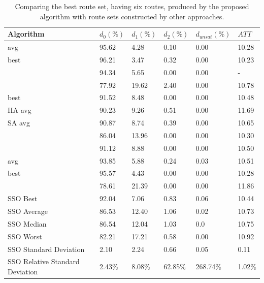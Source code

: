     \begin{table}[H]
    \centering
    \hspace*{-1.0cm}
    \begin{tabular}{|l||l|l|l|l|l|}
    \hline
    Algorithm & $d_0(\%)$ & $d_1(\%)$ & $d_2(\%)$ & $d_{unsat}(\%)$ & $ATT$ \\
    \hline
    \citet{kechagiopoulos14} avg & 95.62 & 4.28 & 0.10 & 0.00 & 10.28 \\
    \citet{kechagiopoulos14} best & 96.21 & 3.47 & 0.32 & 0.00 & 10.23 \\
    \citet{nikolic14} & 94.34 & 5.65 & 0.00 & 0.00 & - \\
    \citet{kidwai98} & 77.92 & 19.62 & 2.40 & 0.00 & 10.78 \\
    \citet{fan10} best & 91.52 & 8.48 & 0.00 & 0.00 & 10.48  \\
    \citet{fan10} HA avg & 90.23 & 9.26 & 0.51 & 0.00 & 11.69 \\
    \citet{fan10} SA avg & 90.87 & 8.74 & 0.39 & 0.00 & 10.65 \\
    \citet{chakroborty02} & 86.04 & 13.96 & 0.00 & 0.00 & 10.30 \\
    \citet{zhang10} & 91.12 & 8.88 & 0.00 & 0.00 & 10.50 \\
    \citet{chew12} avg & 93.85 & 5.88 & 0.24 & 0.03 & 10.51 \\
    \citet{chew12} best & 95.57 & 4.43 & 0.00 & 0.00 & 10.28 \\
    \citet{baaj91} & 78.61 & 21.39 & 0.00 & 0.00 & 11.86 \\
    \hline
    \hline
    SSO Best & 92.04 & 7.06 & 0.83 & 0.06 & 10.44 \\
    SSO Average & 86.53 & 12.40 & 1.06 & 0.02 & 10.73 \\
    SSO Median & 86.54 & 12.04 & 1.03 & 0.0 & 10.75 \\
    SSO Worst & 82.21 & 17.21 & 0.58 & 0.00 & 10.92 \\
    SSO Standard Deviation & 2.10 & 2.24 & 0.66 & 0.05 & 0.11 \\
    SSO Relative Standard Deviation & 2.43\% & 8.08\% & 62.85\% & 268.74\% & 1.02\% \\
    \hline
    \end{tabular}
    \caption {Comparing the best route set, having six routes, produced by the proposed algorithm with route sets constructed by other approaches.}
    \label{table:performanceComparison_6}
    \end{table}


